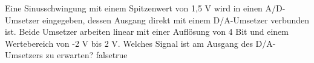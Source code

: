     {Eine Sinusschwingung mit einem Spitzenwert von 1,5 V wird in einen A/D-Umsetzer eingegeben, dessen Ausgang direkt mit einem D/A-Umsetzer verbunden ist. Beide Umsetzer arbeiten linear mit einer Auflösung von 4 Bit und einem Wertebereich von -2 V bis 2 V. Welches Signal ist am Ausgang des D/A-Umsetzers zu erwarten?}
    {}
    {}
    {}
    {}
    {false}{true}